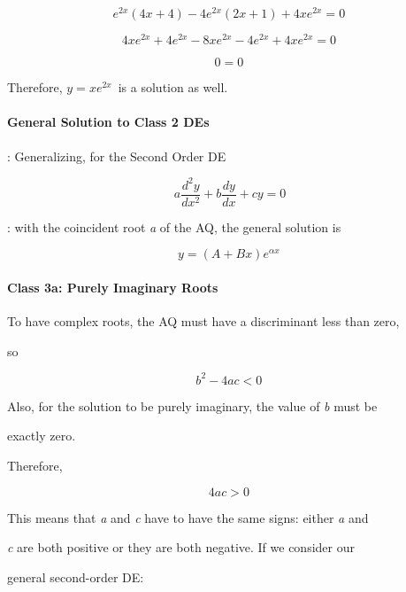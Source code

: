 $$e^{2x}(4x+4)-4e^{2x}(2x+1)+4xe^{2x}=0 \,$$



$$4xe^{2x}+4e^{2x}-8xe^{2x}-4e^{2x}+4xe^{2x}=0 \,$$



$$0=0\,$$



Therefore, $y=xe^{2x}\,$ is a solution as well.



\paragraph{General Solution to Class 2 DEs}



:   Generalizing, for the Second Order DE



$$a\frac{d^2y}{dx^2}+b\frac{dy}{dx}+cy=0$$



:   with the coincident root \textit{a} of the AQ, the general solution is



$$y=(A+Bx)e^{\alpha x} \,$$



\paragraph{Class 3a: Purely Imaginary Roots}



To have complex roots, the AQ must have a discriminant less than zero,

so



$$b^2-4ac < 0 \,$$



Also, for the solution to be purely imaginary, the value of \textit{b} must be

exactly zero.



Therefore,



$$4ac>0\,$$



This means that \textit{a} and \textit{c} have to have the same signs: either \textit{a} and

\textit{c} are both positive or they are both negative. If we consider our

general second-order DE:



